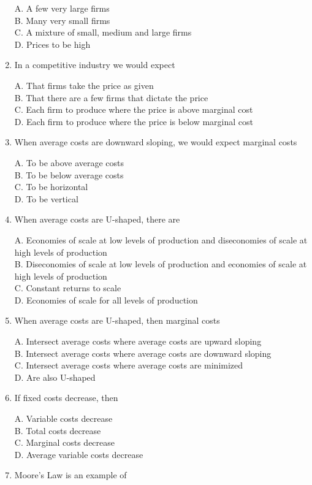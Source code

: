 \documentclass[
]{book}
\begin{document}
\begin{enumerate}
  A. A few very large firms\\
  B. Many very small firms\\
  C. A mixture of small, medium and large firms\\
  D. Prices to be high
\item
  In a competitive industry we would expect

  A. That firms take the price as given\\
  B. That there are a few firms that dictate the price\\
  C. Each firm to produce where the price is above marginal cost\\
  D. Each firm to produce where the price is below marginal cost
\item
  When average costs are downward sloping, we would expect marginal costs

  A. To be above average costs\\
  B. To be below average costs\\
  C. To be horizontal\\
  D. To be vertical
\item
  When average costs are U-shaped, there are

  A. Economies of scale at low levels of production and diseconomies of scale at high levels of production\\
  B. Diseconomies of scale at low levels of production and economies of scale at high levels of production\\
  C. Constant returns to scale\\
  D. Economies of scale for all levels of production
\item
  When average costs are U-shaped, then marginal costs

  A. Intersect average costs where average costs are upward sloping\\
  B. Intersect average costs where average costs are downward sloping\\
  C. Intersect average costs where average costs are minimized\\
  D. Are also U-shaped
\item
  If fixed costs decrease, then

  A. Variable costs decrease\\
  B. Total costs decrease\\
  C. Marginal costs decrease\\
  D. Average variable costs decrease
\item
  Moore's Law is an example of


\end{enumerate}
\end{document}
